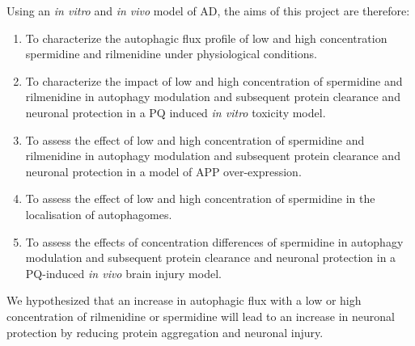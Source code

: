 Using an \textit{in vitro} and \textit{in vivo} model of AD, the aims of this project are therefore: 
\begin{enumerate}

\item To characterize the autophagic flux profile of low and high concentration spermidine and rilmenidine under physiological conditions.
\item To characterize the impact of low and high concentration of spermidine and rilmenidine in autophagy modulation and subsequent protein clearance and neuronal protection in a PQ induced \textit{in vitro} toxicity model. 
\item To assess the effect of low and high concentration of spermidine and rilmenidine in autophagy modulation and subsequent protein clearance and neuronal protection in a model of APP over-expression. 
\item To assess the effect of low and high concentration of spermidine in the localisation of autophagomes.
\item To assess the effects of concentration differences of spermidine in autophagy modulation and subsequent protein clearance and neuronal protection in a PQ-induced \textit{in vivo} brain injury model. 
\end{enumerate}

We hypothesized that an increase in autophagic flux with a low or high concentration of rilmenidine or spermidine will lead to an increase in neuronal protection by reducing protein aggregation and neuronal injury.


